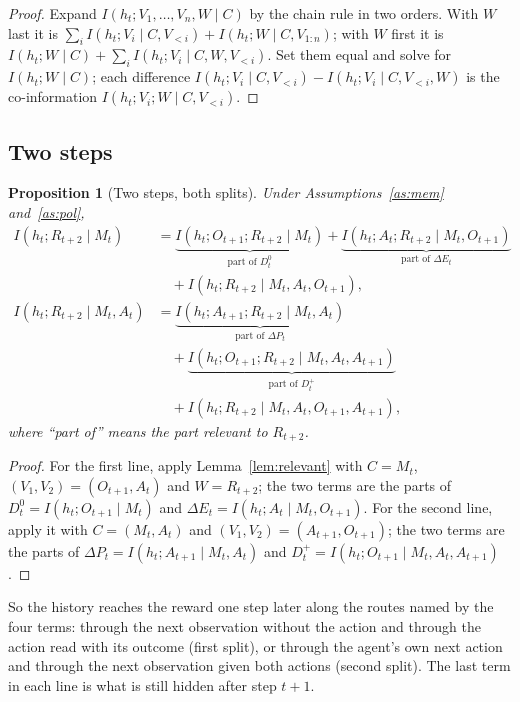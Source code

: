 \documentclass{article}
\newtheorem{proposition}{Proposition}
\theoremstyle{definition}
\theoremstyle{remark}
\newcommand{\dE}{\Delta E}
\newcommand{\dP}{\Delta P}
\begin{document}
\begin{proof}
Expand $I(h_t;V_1,\dots,V_n,W\mid C)$ by the chain rule in two orders. With $W$ last it is $\sum_iI(h_t;V_i\mid C,V_{<i})+I(h_t;W\mid C,V_{1:n})$; with $W$ first it is $I(h_t;W\mid C)+\sum_iI(h_t;V_i\mid C,W,V_{<i})$. Set them equal and solve for $I(h_t;W\mid C)$; each difference $I(h_t;V_i\mid C,V_{<i})-I(h_t;V_i\mid C,V_{<i},W)$ is the co-information $I(h_t;V_i;W\mid C,V_{<i})$.
\end{proof}

\subsection{Two steps}

\begin{proposition}[Two steps, both splits]\label{prop:two-steps}
Under Assumptions~\ref{as:mem} and~\ref{as:pol},
\begin{align*}
I(h_t;R_{t+2}\mid M_t)&=\underbrace{I(h_t;O_{t+1};R_{t+2}\mid M_t)}_{\text{part of }D^0_t}+\underbrace{I(h_t;A_t;R_{t+2}\mid M_t,O_{t+1})}_{\text{part of }\dE_t}\\
&\quad+I(h_t;R_{t+2}\mid M_t,A_t,O_{t+1}),\\[4pt]
I(h_t;R_{t+2}\mid M_t,A_t)&=\underbrace{I(h_t;A_{t+1};R_{t+2}\mid M_t,A_t)}_{\text{part of }\dP_t}\\
&\quad+\underbrace{I(h_t;O_{t+1};R_{t+2}\mid M_t,A_t,A_{t+1})}_{\text{part of }D^+_t}\\
&\quad+I(h_t;R_{t+2}\mid M_t,A_t,O_{t+1},A_{t+1}),
\end{align*}
where ``part of'' means the part relevant to $R_{t+2}$.
\end{proposition}

\begin{proof}
For the first line, apply Lemma~\ref{lem:relevant} with $C=M_t$, $(V_1,V_2)=(O_{t+1},A_t)$ and $W=R_{t+2}$; the two terms are the parts of $D^0_t=I(h_t;O_{t+1}\mid M_t)$ and $\dE_t=I(h_t;A_t\mid M_t,O_{t+1})$. For the second line, apply it with $C=(M_t,A_t)$ and $(V_1,V_2)=(A_{t+1},O_{t+1})$; the two terms are the parts of $\dP_t=I(h_t;A_{t+1}\mid M_t,A_t)$ and $D^+_t=I(h_t;O_{t+1}\mid M_t,A_t,A_{t+1})$.
\end{proof}

So the history reaches the reward one step later along the routes named by the four terms: through the next observation without the action and through the action read with its outcome (first split), or through the agent's own next action and through the next observation given both actions (second split). The last term in each line is what is still hidden after step $t+1$.
\end{document}
